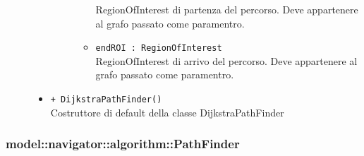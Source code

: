 \documentclass[../DefinizioneDiProdotto.tex]{subfiles}
\begin{document}
\begin{description}
\begin{itemize}
\begin{description}
\begin{itemize}
RegionOfInterest di partenza del percorso. Deve appartenere al grafo passato come paramentro.\item \texttt{endROI : RegionOfInterest}\\
RegionOfInterest di arrivo del percorso. Deve appartenere al grafo passato come paramentro.\end{itemize}
\end{description}
\item \texttt{+ DijkstraPathFinder()}\\
Costruttore di default della classe DijkstraPathFinder
 \end{itemize}
\end{description}

\subsubsection{model::navigator::algorithm::PathFinder}
\end{document}
